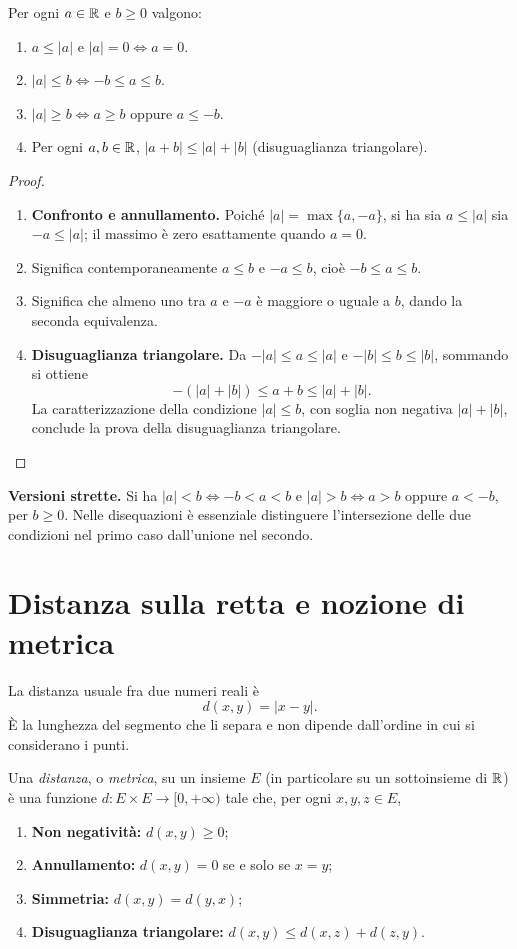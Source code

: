 \begin{proposizione}
Per ogni $a\in\mathbb{R}$ e $b\ge0$ valgono:
\begin{enumerate}[label=\arabic*.]
\item $a\le|a|$ e $|a|=0\Longleftrightarrow a=0$.
\item $|a|\le b\Longleftrightarrow-b\le a\le b$.
\item $|a|\ge b\Longleftrightarrow a\ge b\text{ oppure }a\le-b$.
\item Per ogni $a,b\in\mathbb{R}$, $|a+b|\le|a|+|b|$ (disuguaglianza triangolare).
\end{enumerate}
\end{proposizione}
\begin{proof}
\begin{enumerate}[label=\arabic*.]
\item \textbf{Confronto e annullamento.} Poiché $|a|=\max\{a,-a\}$, si ha sia $a\le|a|$ sia $-a\le|a|$; il massimo è zero esattamente quando $a=0$.
\item {} Significa contemporaneamente $a\le b$ e $-a\le b$, cioè $-b\le a\le b$.
\item {} Significa che almeno uno tra $a$ e $-a$ è maggiore o uguale a $b$, dando la seconda equivalenza.
\item \textbf{Disuguaglianza triangolare.} Da $-|a|\le a\le|a|$ e $-|b|\le b\le|b|$, sommando si ottiene
\[
-(|a|+|b|)\le a+b\le|a|+|b|.
\]
La caratterizzazione della condizione $|a|\le b$, con soglia non negativa $|a|+|b|$, conclude la prova della disuguaglianza triangolare.
\end{enumerate}
\end{proof}

\textbf{Versioni strette.} Si ha $|a|<b\iff-b<a<b$ e $|a|>b\iff a>b\text{ oppure }a<-b$, per $b\ge0$. Nelle disequazioni è essenziale distinguere l'intersezione delle due condizioni nel primo caso dall'unione nel secondo.

\section{Distanza sulla retta e nozione di metrica}

La distanza usuale fra due numeri reali è
\[
d(x,y)=|x-y|.
\]
È la lunghezza del segmento che li separa e non dipende dall'ordine in cui si considerano i punti.

\begin{definizione}
Una \emph{distanza}, o \emph{metrica}, su un insieme $E$ (in particolare su un sottoinsieme di $\mathbb{R}$) è una funzione $d\colon E\times E\to[0,+\infty)$ tale che, per ogni $x,y,z\in E$,
\begin{enumerate}[label=(\alph*)]
  \item \textbf{Non negatività:} $d(x,y)\ge0$;
  \item \textbf{Annullamento:} $d(x,y)=0$ se e solo se $x=y$;
  \item \textbf{Simmetria:} $d(x,y)=d(y,x)$;
  \item \textbf{Disuguaglianza triangolare:} $d(x,y)\le d(x,z)+d(z,y)$.
\end{enumerate}
\end{definizione}

